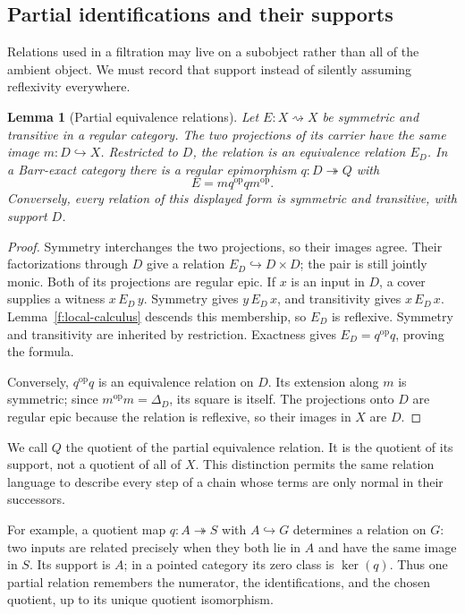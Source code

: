 \documentclass[11pt]{article}
\newtheorem{lemma}[theorem]{Lemma}
\theoremstyle{definition}
\theoremstyle{remark}\newtheorem{remark}[theorem]{Remark}
\DeclareMathOperator{\Ker}{ker}
\begin{document}
\subsection{Partial identifications and their supports}

Relations used in a filtration may live on a subobject rather than all
of the ambient object. We must record that support instead of silently
assuming reflexivity everywhere.

\begin{lemma}[Partial equivalence relations]\label{d:partial-equivalence}
Let $E:X\rightsquigarrow X$ be symmetric and transitive in a regular
category. The two projections of its carrier have the same image
$m:D\hookrightarrow X$. Restricted to $D$, the relation is an
equivalence relation $E_D$. In a Barr-exact category there is a regular
epimorphism $q:D\twoheadrightarrow Q$ with
\[
E=mq^{\mathrm{op}}qm^{\mathrm{op}}.
\]
Conversely, every relation of this displayed form is symmetric and
transitive, with support $D$.
\end{lemma}
\begin{proof}
Symmetry interchanges the two projections, so their images agree.
Their factorizations through $D$ give a relation $E_D\hookrightarrow
D\times D$; the pair is still jointly monic. Both of its projections
are regular epic. If $x$ is an input in $D$, a cover supplies a witness
$x\,E_D\,y$. Symmetry gives $y\,E_D\,x$, and transitivity gives
$x\,E_D\,x$. Lemma~\ref{f:local-calculus} descends this membership,
so $E_D$ is reflexive. Symmetry and transitivity are inherited by
restriction. Exactness gives $E_D=q^{\mathrm{op}}q$, proving the formula.

Conversely, $q^{\mathrm{op}}q$ is an equivalence relation on $D$.
Its extension along $m$ is symmetric; since $m^{\mathrm{op}}m=\Delta_D$,
its square is itself. The projections onto $D$ are regular epic
because the relation is reflexive, so their images in $X$ are $D$.
\end{proof}

We call $Q$ the quotient of the partial equivalence relation. It is
the quotient of its support, not a quotient of all of $X$. This
distinction permits the same relation language to describe every step
of a chain whose terms are only normal in their successors.

For example, a quotient map $q:A\twoheadrightarrow S$ with
$A\hookrightarrow G$ determines a relation on $G$: two inputs are
related precisely when they both lie in $A$ and have the same image
in $S$. Its support is $A$; in a pointed category its zero class is
$\Ker(q)$. Thus one partial relation remembers the numerator, the
identifications, and the chosen quotient, up to its unique quotient
isomorphism.
\end{document}
